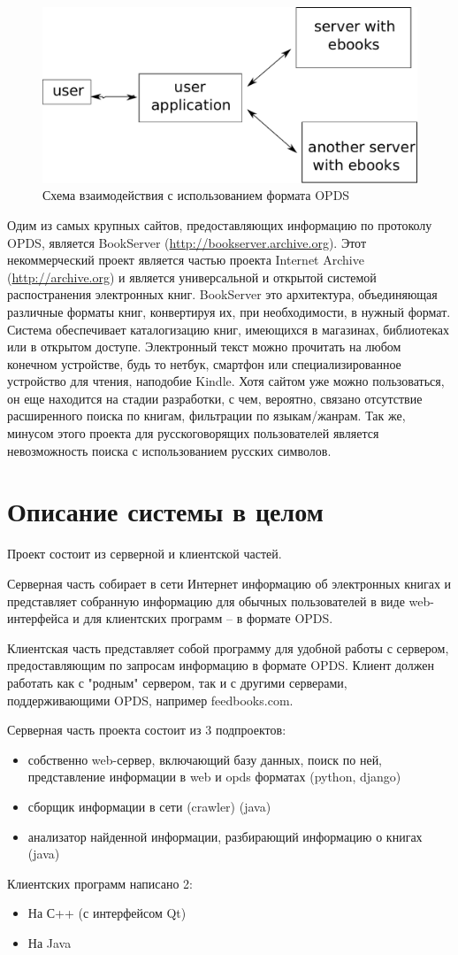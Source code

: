 \documentclass[a4paper]{report}
\begin{document}
\begin{figure}
\centering
\includegraphics[width=.5\textwidth]{scheme}
\caption{Схема взаимодействия с использованием формата OPDS}\label{fig:scheme}
\end{figure}

Одим из самых крупных сайтов, предоставляющих информацию по протоколу OPDS, является BookServer (\url{http://bookserver.archive.org}).
Этот некоммерческий проект является частью проекта Internet Archive (\url{http://archive.org}) и является универсальной и открытой системой распостранения электронных книг. BookServer это архитектура, объединяющая различные форматы книг, конвертируя их, при необходимости, в нужный формат. Система обеспечивает каталогизацию книг, имеющихся в магазинах, библиотеках или в открытом доступе. Электронный текст можно прочитать на любом конечном устройстве, будь то нетбук, смартфон или специализированное устройство для чтения, наподобие Kindle. Хотя сайтом уже можно пользоваться, он еще находится на стадии разработки, с чем, вероятно, связано отсутствие расширенного поиска по книгам, фильтрации по языкам/жанрам. Так же, минусом этого проекта для русскоговорящих пользователей является невозможность поиска с использованием русских символов.

\section{Описание системы в целом}
Проект состоит из серверной и клиентской частей.

Серверная часть собирает в сети Интернет информацию об электронных книгах и представляет собранную информацию для обычных пользователей в виде web-интерфейса и для клиентских программ -- в формате OPDS.

Клиентская часть представляет собой программу для удобной работы с сервером, предоставляющим по запросам информацию в формате OPDS. Клиент должен работать как с "родным" сервером, так и с другими серверами, поддерживающими OPDS, например feedbooks.com.

Серверная часть проекта состоит из 3 подпроектов:
\begin{itemize}
	\item собственно web-сервер, включающий базу данных, поиск по ней, представление информации в web и opds форматах (python, django)
	\item сборщик информации в сети (crawler) (java)
	\item анализатор найденной информации, разбирающий информацию о книгах (java) 
\end{itemize}
Клиентских программ написано 2:
\begin{itemize}
	\item На С++ (с интерфейсом Qt)
	\item На Java 
\end{itemize}
\end{document}
